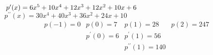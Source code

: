 \documentclass[12pt]{article}
\begin{document}
$\hspace*{0.8mm}p^\prime(x) = 6 x^5 + 10 x^4 + 12 x^3 + 12 x^2  + 10 x + 6  $\\
$p^{\prime\prime}(x) = 30 x^4 + 40 x^3+ 36 x^2 + 24 x + 10  $\\
$$
    \begin{matrix}
        p(-1) = 0 & p(0) = 7        & p(1) = 28                 & p(2) = 247 \\
                  & p^\prime(0) = 6 & p^\prime(1) = 56          &            \\
                  &                 & p^{\prime\prime}(1) = 140 &            \\
    \end{matrix}
$$
\end{document}
